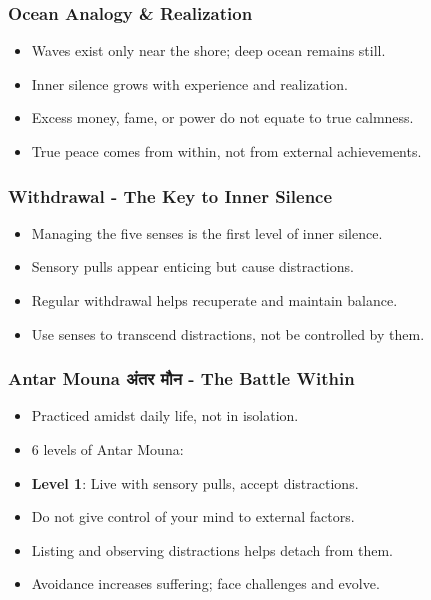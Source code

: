 \begin{frame}[fragile]\frametitle{Ocean Analogy \& Realization}
    \begin{itemize}
        \item Waves exist only near the shore; deep ocean remains still.
        \item Inner silence grows with experience and realization.
        \item Excess money, fame, or power do not equate to true calmness.
        \item True peace comes from within, not from external achievements.
    \end{itemize}
\end{frame}

\begin{frame}[fragile]\frametitle{Withdrawal - The Key to Inner Silence}
    \begin{itemize}
        \item Managing the five senses is the first level of inner silence.
        \item Sensory pulls appear enticing but cause distractions.
        \item Regular withdrawal helps recuperate and maintain balance.
        \item Use senses to transcend distractions, not be controlled by them.
    \end{itemize}
\end{frame}

\begin{frame}[fragile]\frametitle{Antar Mouna अंतर मौन  - The Battle Within}
    \begin{itemize}
        \item Practiced amidst daily life, not in isolation.
        \item 6 levels of Antar Mouna:
        \item \textbf{Level 1}: Live with sensory pulls, accept distractions.
        \item Do not give control of your mind to external factors.
        \item Listing and observing distractions helps detach from them.
        \item Avoidance increases suffering; face challenges and evolve.
    \end{itemize}
\end{frame}


